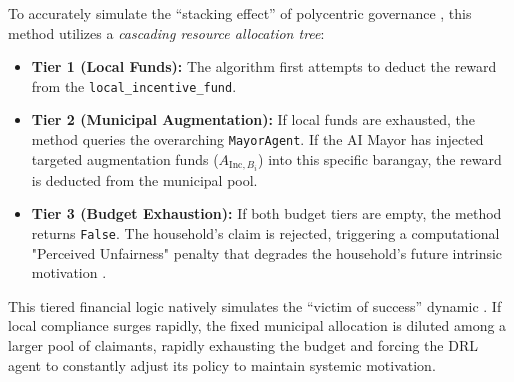 To accurately simulate the ``stacking effect'' of polycentric governance \citep{Ostrom2010}, this method utilizes a \textit{cascading resource allocation tree}:
\begin{itemize}
    \item \textbf{Tier 1 (Local Funds):} The algorithm first attempts to deduct the  reward from the \texttt{local\_incentive\_fund}. 
    \item \textbf{Tier 2 (Municipal Augmentation):} If local funds are exhausted, the method queries the overarching \texttt{MayorAgent}. If the AI Mayor has injected targeted augmentation funds ($A_{\mathrm{Inc}, B_i}$) into this specific barangay, the reward is deducted from the municipal pool.
    \item \textbf{Tier 3 (Budget Exhaustion):} If both budget tiers are empty, the method returns \texttt{False}. The household's claim is rejected, triggering a computational "Perceived Unfairness" penalty that degrades the household's future intrinsic motivation \citep{Chen2023}.
\end{itemize}

This tiered financial logic natively simulates the ``victim of success'' dynamic \citep{WorldBank2022}. If local compliance surges rapidly, the fixed municipal allocation is diluted among a larger pool of claimants, rapidly exhausting the budget and forcing the DRL agent to constantly adjust its policy to maintain systemic motivation.

